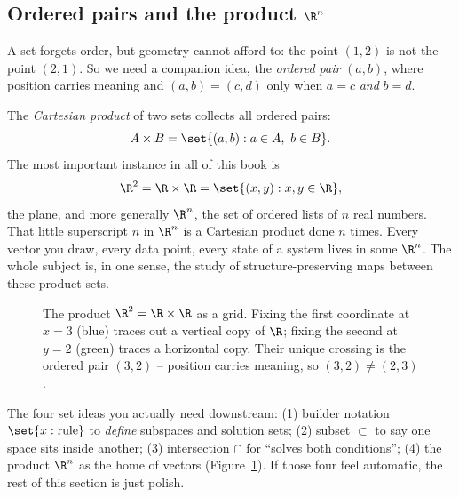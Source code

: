 \subsection{Ordered pairs and the product $\R^n$}

A set forgets order, but geometry cannot afford to: the point $(1,2)$ is not the point
$(2,1)$. So we need a companion idea, the \emph{ordered pair} $(a,b)$, where position
carries meaning and $(a,b) = (c,d)$ only when $a=c$ \emph{and} $b=d$.

The \emph{Cartesian product} of two sets collects all ordered pairs:
\[
  A \times B = \set{(a,b) : a \in A,\ b \in B}.
\]
The most important instance in all of this book is
\[
  \R^2 = \R \times \R = \set{(x,y) : x,y \in \R},
\]
the plane, and more generally $\R^n$, the set of ordered lists of $n$ real numbers. That
little superscript $n$ in $\R^n$ is a Cartesian product done $n$ times. Every vector you
draw, every data point, every state of a system lives in some $\R^n$. The whole subject
is, in one sense, the study of structure-preserving maps between these product sets.

\begin{figure}[H]
\centering
{}
\caption{The product $\R^2 = \R \times \R$ as a grid. Fixing the first coordinate at
$x=3$ (blue) traces out a vertical copy of $\R$; fixing the second at $y=2$ (green) traces
a horizontal copy. Their unique crossing is the ordered pair $(3,2)$ -- position carries
meaning, so $(3,2) \ne (2,3)$.}
\label{ch38:product}
\end{figure}

\begin{focusbox}
The four set ideas you actually need downstream: (1) builder notation
$\set{x : \text{rule}}$ to \emph{define} subspaces and solution sets; (2) subset $\subset$
to say one space sits inside another; (3) intersection $\cap$ for ``solves both
conditions''; (4) the product $\R^n$ as the home of vectors
(Figure~\ref{ch38:product}). If those four feel automatic,
the rest of this section is just polish.
\end{focusbox}

